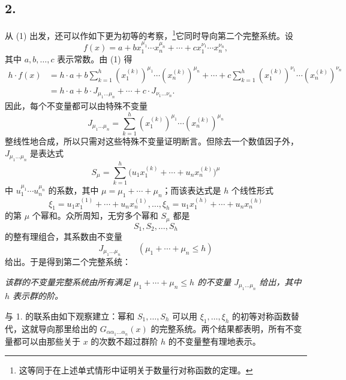 \subsection*{2.}
从 (1) 出发，还可以作如下更为初等的考察，\footnote{这等同于在上述单式情形中证明关于数量行对称函数的定理。}它同时导向第二个完整系统。设
\[
  f(x)=a+b x_1^{\mu_1}\cdots x_n^{\mu_n}
       +\cdots+c x_1^{\nu_1}\cdots x_n^{\nu_n},
\]
其中 $a,b,\ldots,c$ 表示常数。由 (1) 得
\[
\begin{aligned}
 h\cdot f(x)
 &=h\cdot a+b\sum_{k=1}^{h}(x_1^{(k)})^{\mu_1}\cdots(x_n^{(k)})^{\mu_n}
     +\cdots
     +c\sum_{k=1}^{h}(x_1^{(k)})^{\nu_1}\cdots(x_n^{(k)})^{\nu_n} \\
 &=h\cdot a+b\cdot J_{\mu_1\ldots\mu_n}+\cdots+c\cdot J_{\nu_1\ldots\nu_n}.
\end{aligned}
\]
因此，每个不变量都可以由特殊不变量
\[
  J_{\mu_1\ldots\mu_n}
  =\sum_{k=1}^{h}(x_1^{(k)})^{\mu_1}\cdots(x_n^{(k)})^{\mu_n}
\]
整线性地合成，所以只需对这些特殊不变量证明断言。但除去一个数值因子外，$J_{\mu_1\ldots\mu_n}$ 是表达式
\[
  S_\mu=\sum_{k=1}^{h}
  \bigl(u_1x_1^{(k)}+\cdots+u_nx_n^{(k)}\bigr)^{\mu}
\]
中 $u_1^{\mu_1}\cdots u_n^{\mu_n}$ 的系数，其中 $\mu=\mu_1+\cdots+\mu_n$；而该表达式是 $h$ 个线性形式
\[
  \xi_1=u_1x_1^{(1)}+\cdots+u_nx_n^{(1)},\ldots,
  \xi_h=u_1x_1^{(h)}+\cdots+u_nx_n^{(h)}
\]
的第 $\mu$ 个幂和。众所周知，无穷多个幂和 $S_\mu$ 都是
\[
  S_1,S_2,\ldots,S_h
\]
的整有理组合，其系数由不变量
\[
  J_{\mu_1\ldots\mu_n}\qquad(\mu_1+\cdots+\mu_n\le h)
\]
给出。于是得到第二个完整系统：

\emph{该群的不变量完整系统由所有满足 $\mu_1+\cdots+\mu_n\le h$ 的不变量 $J_{\mu_1\ldots\mu_n}$ 给出，其中 $h$ 表示群的阶。}

与 1. 的联系由如下观察建立：幂和 $S_1,\ldots,S_h$ 可以用 $\xi_1,\ldots,\xi_h$ 的初等对称函数替代，这就导向那里给出的 $G_{\alpha\alpha_1\ldots\alpha_n}(x)$ 的完整系统。两个结果都表明，所有不变量都可以由那些关于 $x$ 的次数不超过群阶 $h$ 的不变量整有理地表示。

